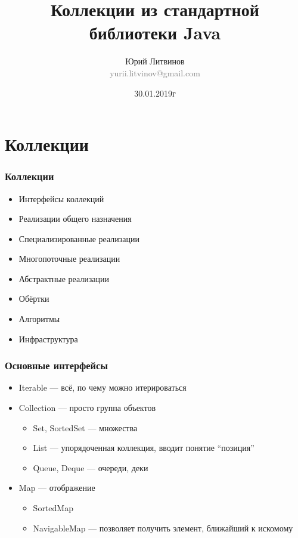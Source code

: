 \documentclass[xetex,mathserif,serif]{beamer}
\title{Коллекции из стандартной библиотеки Java}
\author[Юрий Литвинов]{Юрий Литвинов\\\small{\textcolor{gray}{yurii.litvinov@gmail.com}}}
\date{30.01.2019г}
\begin{document}
	\frame{\titlepage}

	\section{Коллекции}

	\begin{frame}
		\frametitle{Коллекции}
		\begin{itemize}
			\item Интерфейсы коллекций
			\item Реализации общего назначения
			\item Специализированные реализации
			\item Многопоточные реализации
			\item Абстрактные реализации
			\item Обёртки
			\item Алгоритмы
			\item Инфраструктура
		\end{itemize}
	\end{frame}

	\begin{frame}
		\frametitle{Основные интерфейсы}
		\begin{itemize}
			\item Iterable --- всё, по чему можно итерироваться
			\item Collection --- просто группа объектов
			\begin{itemize}
				\item Set, SortedSet --- множества
				\item List --- упорядоченная коллекция, вводит понятие ``позиция''
				\item Queue, Deque --- очереди, деки
			\end{itemize}
			\item Map --- отображение
			\begin{itemize}
				\item SortedMap
				\item NavigableMap --- позволяет получить элемент, ближайший к искомому
			\end{itemize}
		\end{itemize}
	\end{frame}
\end{document}

